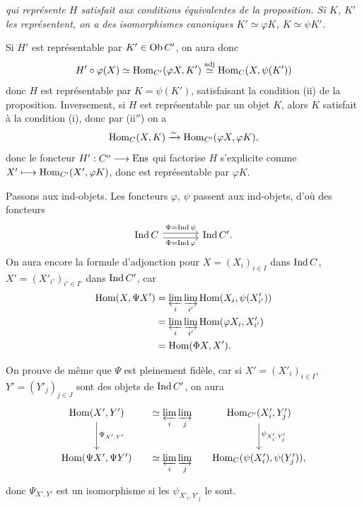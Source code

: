\noindent{}%
\textit{qui représente $H$ satisfait aux conditions équivalentes de la proposition. Si $K$, $K'$ les représentent, on a des isomorphismes canoniques $K' \simeq \varphi K$, $K \simeq \psi K'$.}

Si $H'$ est représentable par $K' \in \mathrm{Ob}\, C'$, on aura donc
\[
H'\circ\varphi(X) \simeq \mathrm{Hom}_{C'}(\varphi X,K') \overset{\mathrm{adj}}{\simeq} \mathrm{Hom}_C(X,\psi(K'))
\]
donc $H$ est représentable par $K = \psi(K')$, satisfaisant la condition (ii) de la proposition. Inversement, si $H$ est représentable par un objet $K$, alors $K$ satisfait à la condition (i), donc par (ii$''$) on a
\[
\mathrm{Hom}_C(X,K) \xrightarrow{\sim} \mathrm{Hom}_{C'}(\varphi X,\varphi K),
\]
donc le foncteur $H' : C^o \longrightarrow \mathrm{Ens}$ qui factorise $H$ s'explicite comme $X' \longmapsto \mathrm{Hom}_{C'}(X',\varphi K)$, donc est représentable par $\varphi K$. %

Passons aux ind-objets. Les foncteurs $\varphi$, $\psi$ passent aux ind-objets, d'où des foncteurs
\[
\begin{tikzcd}[column sep=large]
\Ind C \arrow[r,shift left,"\Psi = \Ind\psi"] \arrow[r,shift right,"\Phi = \Ind\varphi"'] & \Ind C'.
\end{tikzcd} %
\]
On aura encore la formule d'adjonction pour $X = (X_i)_{i\in I}$ dans $\operatorname{Ind} C$, $X' = (X'_{i'})_{i'\in I'}$ dans $\operatorname{Ind} C'$, car
\[
\begin{aligned}
\mathrm{Hom}(X,\Psi X') &= \varprojlim_i \varinjlim_{i'} \mathrm{Hom}(X_i,\psi(X'_{i'}))\\
&= \varprojlim_i \varinjlim_{i'} \mathrm{Hom}(\varphi X_i,X'_{i'})\\
&= \mathrm{Hom}(\Phi X,X').
\end{aligned}
\]

\noindent{}%
On prouve de même que $\Psi$ est pleinement fidèle, car si $X' = (X'_i)_{i\in I}$, $Y' = (Y'_j)_{j\in J}$ sont des objets de $\operatorname{Ind} C'$, on aura
\[
\begin{tikzcd}[column sep=small]
\Hom(X',Y') \arrow[d,"\Psi_{X',Y'}"] & \simeq \varprojlim\limits_i \varinjlim\limits_j & \Hom_{C'}(X'_i,Y'_j) \arrow[d,"\psi_{X'_i,Y'_j}"] \\
\Hom(\Psi X',\Psi Y') & \simeq \varprojlim\limits_i \varinjlim\limits_j & \Hom_C(\psi(X'_i),\psi(Y'_j)),
\end{tikzcd}
\]
donc $\Psi_{X',Y'}$ est un isomorphisme si les $\psi_{X'_i,Y'_j}$ le sont.

